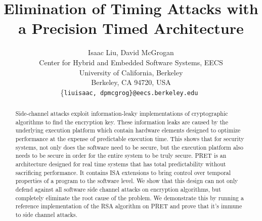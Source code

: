 \documentclass[times, 10pt,twocolumn]{article}
\begin{document}
  \title{Elimination of Timing Attacks with a Precision Timed Architecture}

  \author{Isaac Liu, David McGrogan \\
    Center for Hybrid and Embedded Software Systems, EECS \\
    University of California, Berkeley \\
    Berkeley, CA 94720, USA \\
    \{\tt liuisaac, dpmcgrog\}@eecs.berkeley.edu
  }


\maketitle
\thispagestyle{empty}

\begin{abstract}
Side-channel attacks exploit information-leaky implementations of cryptographic algorithms to find the encryption key. These information leaks are caused by the underlying execution platform which contain hardware elements designed to optimize performance at the expense of predictable execution time. This shows that for security systems, not only does the software need to be secure, but the execution platform also needs to be secure in order for the entire system to be truly secure. PRET is an architecture designed for real time systems that has total predictability without sacrificing performance. It contains ISA extensions to bring control over temporal properties of a program to the software level. We show that this design can not only defend against all software side channel attacks on encryption algorithms, but completely eliminate the root cause of the problem. We demonstrate this by running a reference implementation of the RSA algorithm on PRET and prove that it's immune to side channel attacks.
\end{abstract}


\end{document}
